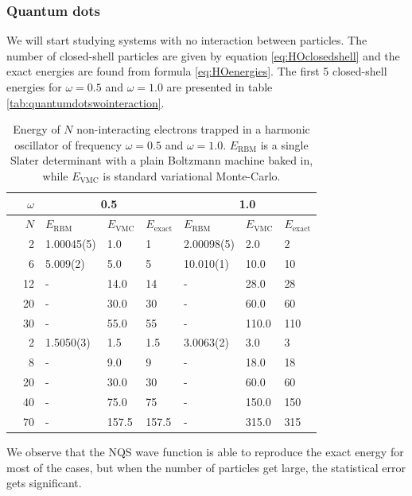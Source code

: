 \subsubsection{Quantum dots}
We will start studying systems with no interaction between particles. The number of closed-shell particles are given by equation \eqref{eq:HOclosedshell} and the exact energies are found from formula \eqref{eq:HOenergies}. The first 5 closed-shell energies for $\omega=0.5$ and $\omega=1.0$ are presented in table \eqref{tab:quantumdotswointeraction}.

\begin{table} [H]
	\caption{Energy of $N$ non-interacting electrons trapped in a harmonic oscillator of frequency $\omega=0.5$ and $\omega=1.0$. $E_{\text{RBM}}$ is a single Slater determinant with a plain Boltzmann machine baked in, while $E_{\text{VMC}}$ is standard variational Monte-Carlo.}
	\label{tab:quantumdotswointeraction}
	\begin{tabularx}{\textwidth}{r|r|XXX:XXX} \hline\hline
		\label{tab:nn}
		& $\omega$ & &\\ \hline
		& $N$ & $E_{\text{RBM}}$ & $E_{\text{VMC}}$ & $E_{\text{exact}}$ & $E_{\text{RBM}}$ & $E_{\text{VMC}}$ & $E_{\text{exact}}$ \\ \hline
		
		\parbox[t]{2mm}{}
		&2 & 1.00045(5) & 1.0 & 1 & 2.00098(5) & 2.0 & 2\\
		&6 & 5.009(2) & 5.0 & 5 & 10.010(1) & 10.0 & 10 \\
		&12 & - & 14.0 & 14 & - & 28.0 & 28\\
		&20 & - & 30.0 & 30 & - & 60.0 & 60\\
		&30 & - & 55.0 & 55 & - & 110.0 & 110\\ \hline
		
		\parbox[t]{2mm}{}
		&2 & 1.5050(3) & 1.5 & 1.5 & 3.0063(2) & 3.0 & 3 \\
		&8 & - & 9.0 & 9 & - & 18.0 & 18 \\
		&20 & - & 30.0 & 30 & - & 60.0 & 60 \\
		&40 & - & 75.0 & 75 & - & 150.0 & 150 \\
		&70 & - & 157.5 & 157.5 & - & 315.0 & 315 \\ \hline\hline
	\end{tabularx}
\end{table}
We observe that the NQS wave function is able to reproduce the exact energy for most of the cases, but when the number of particles get large, the statistical error gets significant.

